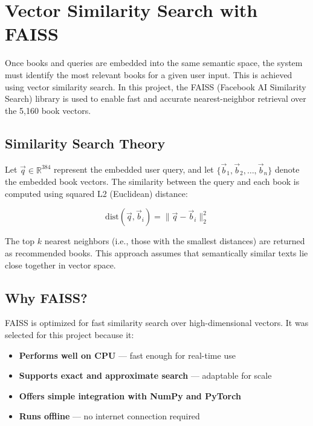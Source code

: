 \chapter{Vector Similarity Search with FAISS}
\label{chapter:faiss}

Once books and queries are embedded into the same semantic space, the system must identify the most relevant books for a given user input. This is achieved using vector similarity search. In this project, the FAISS (Facebook AI Similarity Search) library \parencite{faiss} is used to enable fast and accurate nearest-neighbor retrieval over the 5,160 book vectors.

\section{Similarity Search Theory}
\label{sec:similarity-theory}

Let \( \vec{q} \in \mathbb{R}^{384} \) represent the embedded user query, and let \( \{\vec{b}_1, \vec{b}_2, \dots, \vec{b}_n\} \) denote the embedded book vectors. The similarity between the query and each book is computed using squared L2 (Euclidean) distance:

\begin{equation}
    \text{dist}(\vec{q}, \vec{b}_i) = \|\vec{q} - \vec{b}_i\|_2^2
\end{equation}

The top \( k \) nearest neighbors (i.e., those with the smallest distances) are returned as recommended books. This approach assumes that semantically similar texts lie close together in vector space.

\section{Why FAISS?}
\label{sec:faiss-choice}

FAISS is optimized for fast similarity search over high-dimensional vectors. It was selected for this project because it:

\begin{itemize}
    \item \textbf{Performs well on CPU} — fast enough for real-time use
    \item \textbf{Supports exact and approximate search} — adaptable for scale
    \item \textbf{Offers simple integration with NumPy and PyTorch}
    \item \textbf{Runs offline} — no internet connection required
\end{itemize}

